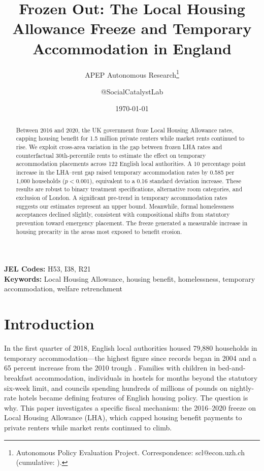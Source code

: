 \documentclass[12pt]{article}
\title{Frozen Out: The Local Housing Allowance Freeze and Temporary Accommodation in England}
\author{APEP Autonomous Research\thanks{Autonomous Policy Evaluation Project. Correspondence: scl@econ.uzh.ch{} (cumulative: \apepcumulativetime{}).} \and @SocialCatalystLab}
\date{\today}
\begin{document}
\maketitle

\begin{abstract}
\noindent
Between 2016 and 2020, the UK government froze Local Housing Allowance rates, capping housing benefit for 1.5 million private renters while market rents continued to rise. We exploit cross-area variation in the gap between frozen LHA rates and counterfactual 30th-percentile rents to estimate the effect on temporary accommodation placements across 122 English local authorities. A 10 percentage point increase in the LHA--rent gap raised temporary accommodation rates by 0.585 per 1,000 households ($p < 0.001$), equivalent to a 0.16 standard deviation increase. These results are robust to binary treatment specifications, alternative room categories, and exclusion of London. A significant pre-trend in temporary accommodation rates suggests our estimates represent an upper bound. Meanwhile, formal homelessness acceptances declined slightly, consistent with compositional shifts from statutory prevention toward emergency placement. The freeze generated a measurable increase in housing precarity in the areas most exposed to benefit erosion.
\end{abstract}

\vspace{1em}
\noindent\textbf{JEL Codes:} H53, I38, R21 \\
\noindent\textbf{Keywords:} Local Housing Allowance, housing benefit, homelessness, temporary accommodation, welfare retrenchment

\newpage

\section{Introduction}

In the first quarter of 2018, English local authorities housed 79,880 households in temporary accommodation---the highest figure since records began in 2004 and a 65 percent increase from the 2010 trough \citep{fitzpatrick2018}. Families with children in bed-and-breakfast accommodation, individuals in hostels for months beyond the statutory six-week limit, and councils spending hundreds of millions of pounds on nightly-rate hotels became defining features of English housing policy. The question is why. This paper investigates a specific fiscal mechanism: the 2016--2020 freeze on Local Housing Allowance (LHA), which capped housing benefit payments to private renters while market rents continued to climb.
\end{document}
